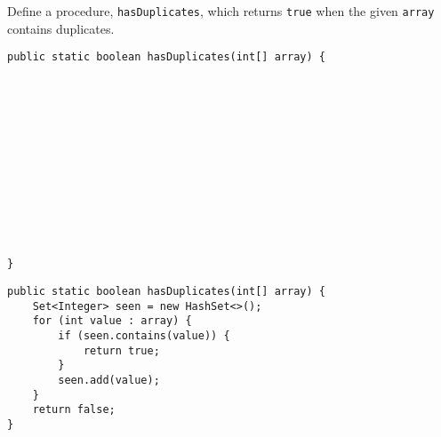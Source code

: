 \begin{blocksection}
\question Define a procedure, \lstinline$hasDuplicates$, which returns
\lstinline$true$ when the given \lstinline$array$ contains duplicates.

\ifprintanswers\else
\begin{lstlisting}
public static boolean hasDuplicates(int[] array) {













}
\end{lstlisting}
\fi

\begin{solution}
\begin{lstlisting}
public static boolean hasDuplicates(int[] array) {
    Set<Integer> seen = new HashSet<>();
    for (int value : array) {
        if (seen.contains(value)) {
            return true;
        }
        seen.add(value);
    }
    return false;
}
\end{lstlisting}
\end{solution}
\end{blocksection}
